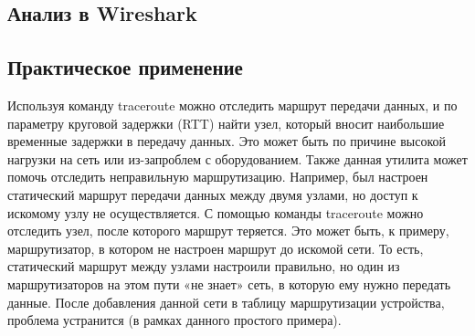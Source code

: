 \subsection{Анализ в Wireshark}

\subsection{Практическое применение}
Используя команду traceroute можно отследить маршрут передачи данных, и по параметру
круговой задержки (RTT) найти узел, который вносит наибольшие временные задержки в
передачу данных. Это может быть по причине высокой нагрузки на сеть или из-запроблем с
оборудованием.
Также данная утилита может помочь отследить неправильную маршрутизацию. Например,
был настроен статический маршрут передачи данных между двумя узлами, но доступ к
искомому узлу не осуществляется. С помощью команды traceroute можно отследить узел,
после которого маршрут теряется. Это может быть, к примеру, маршрутизатор, в котором не
настроен маршрут до искомой сети. То есть, статический маршрут между узлами настроили
правильно, но один из маршрутизаторов на этом пути «не знает» сеть, в которую ему нужно
передать данные. После добавления данной сети в таблицу маршрутизации устройства,
проблема устранится (в рамках данного простого примера).



\endinput